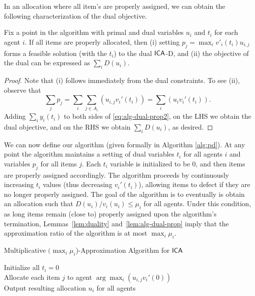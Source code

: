 In an allocation where all item's are properly
assigned, we can obtain the following characterization of the dual objective.


\begin{lemma}
\label{lem:alg-dual-prop}
Fix a point in the algorithm with primal and dual variables $u_i$ and $t_i$ for each agent $i$. If all items are properly allocated, then (i) setting $p_j = \max_{i} v'_i(t_i)u_{i,j} $ forms a feasible solution (with the $t_i$) to the dual $\mathsf{ICA}$-D, and (ii)
the objective of the dual can be expressed as $\sum_{i} D(u_i)$. 
\end{lemma}

\begin{proof}
Note that (i) follows immediately from the dual constraints. 
To see (ii), observe that
\begin{equation}
\label{eq:alg-dual-prop2}
\sum_j p_j = \sum_i \sum_{j \in A_i} (u_{i,j} v_i'(t_i)) = \sum_i ( u_i v_i'(t_i)).
\end{equation}
Adding $\sum_i y_i(t_i)$ to both sides of  \eqref{eq:alg-dual-prop2}, on the LHS we obtain the dual objective,
and on the RHS we obtain $\sum_{i} D(u_i)$, as desired.
\end{proof}

We can now define our algorithm (given formally in  Algorithm \ref{alg:pd}). At any point the algorithm maintains a 
setting of dual variables $t_i$ for all agents $i$ and variables $p_j$ for all items $j$. 
Each $t_i$ variable is initialized to be 0, and then items are properly assigned accordingly.
The algorithm proceeds by continuously increasing $t_i$ values (thus decreasing $v_i'(t_i)$), allowing items to defect if they are no longer properly assigned. 
The goal of the algorithm is to eventually is obtain an allocation such that $D(u_i)/ v_i(u_i)  \leq \mu_i$ for all agents. 
Under this condition, as long items remain (close to) properly assigned upon the algorithm's termination, Lemmas~\ref{lem:duality} and~\ref{lem:alg-dual-prop} imply that the approximation ratio of the algorithm is at most $\max_i \mu_i$.








\begin{algorithm}
\caption{Multiplicative $(\max_i \mu_i$)-Approximation Algorithm for $\mathsf{ICA}$}
\label{alg:pd}
Initialize all $t_i = 0$ \\
Allocate each item $j$ to agent $\arg\max_{i} \left(u_{i,j}v_i'(0)\right)$ \\
Output resulting allocation $u_i$ for all agents
\end{algorithm}

